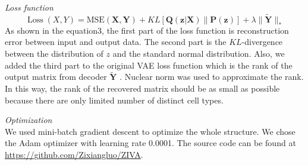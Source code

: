 \vspace{0.5cm}
\noindent\emph{Loss function} \\
\begin{equation}
    \operatorname{Loss}(X, Y)=\text {MSE}(\boldsymbol{X}, \boldsymbol{Y}) + 
    KL[\boldsymbol{Q}(\boldsymbol{z} | \boldsymbol{X}) \| \boldsymbol{P}(\boldsymbol{z})] + \lambda\|\mathbf{\widetilde{\boldsymbol{Y}}}\|_{*}
\end{equation}
As shown in the equation3, the first part of the loss function is reconstruction error between input and output data. The second part is the $KL$-divergence between the distribution of $z$ and the standard normal distribution. Also, we added the third part to the original VAE loss function which is the rank of the output matrix from decoder $\widetilde{\boldsymbol{Y}}$ . Nuclear norm was used to approximate the rank. In this way, the rank of the recovered matrix should be as small as possible because there are only limited number of distinct cell types. 

\vspace{0.5cm}
\noindent\emph{Optimization} \\
We used mini-batch gradient descent to optimize the whole structure. We chose the Adam optimizer with learning rate 0.0001. The source code can be found at \url{https://github.com/Zixiangluo/ZIVA}.


